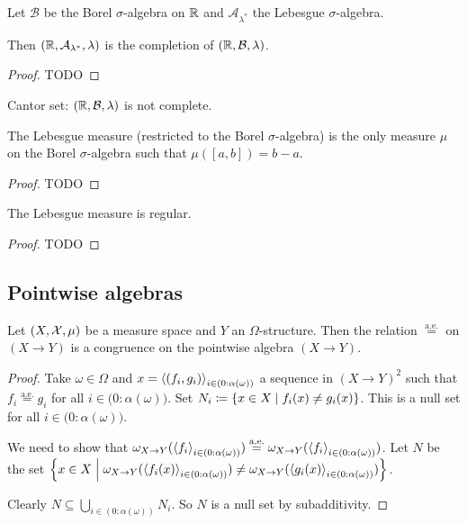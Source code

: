 \begin{proposition}
Let $\mathcal{B}$ be the Borel $\sigma$-algebra on $\mathbb{R}$ and $\mathcal{A}_{\lambda^*}$ the Lebesgue $\sigma$-algebra.

Then $\sSet{\R, \mathcal{A}_{\lambda^*}, \lambda}$ is the completion of $\sSet{\R, \mathcal{B}, \lambda}$.
\end{proposition}
\begin{proof}
TODO
\end{proof}

\begin{example}
Cantor set: $\sSet{\R, \mathcal{B}, \lambda}$ is not complete.
\end{example}

\begin{proposition}
The Lebesgue measure (restricted to the Borel $\sigma$-algebra) is the only measure $\mu$ on the Borel $\sigma$-algebra such that $\mu([a,b]) = b-a$.
\end{proposition}
\begin{proof}
TODO
\end{proof}

\begin{proposition}
The Lebesgue measure is regular.
\end{proposition}
\begin{proof}
TODO
\end{proof}

\subsection{Pointwise algebras}
\begin{lemma} \label{equalAECongruence}
Let $\sSet{X, \mathcal{X}, \mu}$ be a measure space and $Y$ an $\Omega$-structure. Then the relation $\overset{\text{a.e.}}{=}$ on $(X\to Y)$ is a congruence on the pointwise algebra $(X\to Y)$.
\end{lemma}
\begin{proof}
Take $\omega\in\Omega$ and $x = \left\langle (f_i,g_i) \right\rangle_{i\in(0:\alpha(\omega))}$ a sequence in $(X\to Y)^2$ such that $f_i\mathrel{\overset{\text{a.e.}}{=}} g_i$ for all $i\in \big(0:\alpha(\omega)\big)$. Set $N_i \defeq \setbuilder{x\in X}{f_i(x)\neq g_i(x)}$. This is a null set for all $i\in\big(0:\alpha(\omega)\big)$.

We need to show that $\omega_{X\to Y}(\left\langle f_i \right\rangle_{i\in(0:\alpha(\omega))})\mathrel{\overset{\text{a.e.}}{=}}\omega_{X\to Y}(\left\langle f_i \right\rangle_{i\in(0:\alpha(\omega))})$. Let $N$ be the set $\setbuilder{x\in X}{\omega_{X\to Y}(\seq{f_i(x)}_{i\in(0:\alpha(\omega))}) \neq \omega_{X\to Y}(\seq{g_i(x)}_{i\in(0:\alpha(\omega))})}$.

Clearly $N\subseteq \bigcup_{i\in(0:\alpha(\omega))}N_i$. So $N$ is a null set by subadditivity.
\end{proof}

